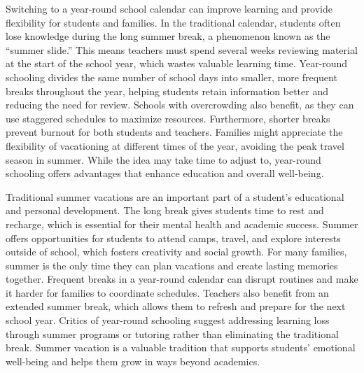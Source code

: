\documentclass[12pt]{article}
\begin{document}
\begin{tcolorbox}[colframe=black!60, colback=white, 
coltitle=black, colbacktitle=black!15, fonttitle=\bfseries\Large, 
title=Source 1: Benefits of Year-Round Schooling, halign title=center, left=10pt, right=10pt, top=10pt, bottom=15pt]
Switching to a year-round school calendar can improve learning and provide flexibility for students and families. In the traditional calendar, students often lose knowledge during the long summer break, a phenomenon known as the “summer slide.” This means teachers must spend several weeks reviewing material at the start of the school year, which wastes valuable learning time. Year-round schooling divides the same number of school days into smaller, more frequent breaks throughout the year, helping students retain information better and reducing the need for review. Schools with overcrowding also benefit, as they can use staggered schedules to maximize resources. Furthermore, shorter breaks prevent burnout for both students and teachers. Families might appreciate the flexibility of vacationing at different times of the year, avoiding the peak travel season in summer. While the idea may take time to adjust to, year-round schooling offers advantages that enhance education and overall well-being.

 
 

 
\end{tcolorbox}

\vspace{1em}

\begin{tcolorbox}[colframe=black!60, colback=white, 
coltitle=black, colbacktitle=black!15, fonttitle=\bfseries\Large, 
title=Source 2: Why Summer Break is Essential, halign title=center, left=10pt, right=10pt, top=10pt, bottom=15pt]
Traditional summer vacations are an important part of a student’s educational and personal development. The long break gives students time to rest and recharge, which is essential for their mental health and academic success. Summer offers opportunities for students to attend camps, travel, and explore interests outside of school, which fosters creativity and social growth. For many families, summer is the only time they can plan vacations and create lasting memories together. Frequent breaks in a year-round calendar can disrupt routines and make it harder for families to coordinate schedules. Teachers also benefit from an extended summer break, which allows them to refresh and prepare for the next school year. Critics of year-round schooling suggest addressing learning loss through summer programs or tutoring rather than eliminating the traditional break. Summer vacation is a valuable tradition that supports students’ emotional well-being and helps them grow in ways beyond academics. 
\end{tcolorbox}
\end{document}
